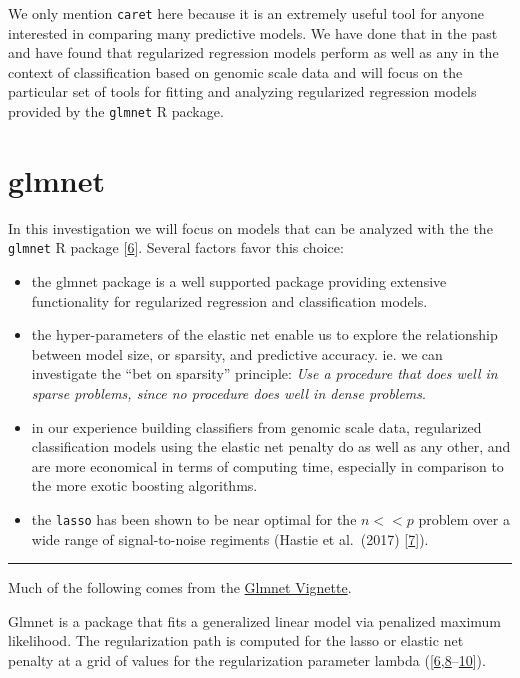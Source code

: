 \documentclass[
]{book}
\begin{document}
We only mention \texttt{caret} here because it is an extremely useful tool for
anyone interested in comparing many predictive models. We have done that
in the past and have found that regularized regression models perform
as well as any in the context of classification based on genomic scale data
and will focus on the particular set of tools for fitting and analyzing
regularized regression models provided by the \texttt{glmnet} R package.

\hypertarget{glmnet}{%
\section{glmnet}\label{glmnet}}

In this investigation we will focus on models that can be
analyzed with the the \texttt{glmnet} R package {[}\protect\hyperlink{ref-Friedman:2010aa}{6}{]}. Several
factors favor this choice:

\begin{itemize}
\item
  the glmnet package is a well supported package providing
  extensive functionality for regularized regression and classification models.
\item
  the hyper-parameters of the elastic net enable us to explore
  the relationship between model size, or sparsity, and predictive accuracy.
  ie. we can investigate the ``bet on sparsity'' principle:
  \emph{Use a procedure that does well in sparse problems, since no procedure
  does well in dense problems}.
\item
  in our experience building classifiers from genomic scale data, regularized
  classification models using the elastic net penalty do as well as any other,
  and are more economical in terms of computing time, especially in comparison to
  the more exotic boosting algorithms.
\item
  the \texttt{lasso} has been shown to be near optimal for the \(n<<p\) problem
  over a wide range of signal-to-noise regiments (Hastie et al.~(2017) {[}\protect\hyperlink{ref-Hastie:2017aa}{7}{]}).
\end{itemize}

\begin{center}\rule{0.5\linewidth}{0.5pt}\end{center}

Much of the following comes from the
\href{https://web.stanford.edu/~hastie/glmnet/glmnet_alpha.html}{Glmnet Vignette}.

Glmnet is a package that fits a generalized linear model via penalized maximum likelihood.
The regularization path is computed for the lasso or elastic net penalty at a
grid of values for the regularization parameter lambda
({[}\protect\hyperlink{ref-Friedman:2010aa}{6},\protect\hyperlink{ref-Tibshirani:2012aa}{8}--\protect\hyperlink{ref-Simon:2013aa}{10}{]}).
\end{document}
